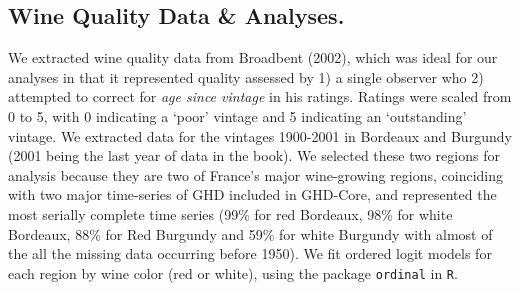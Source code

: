 \documentclass[final]{nature}
\begin{document}
\begin{methods}
\subsection{Wine Quality Data \& Analyses.}
We extracted wine quality data from Broadbent (2002)\cite{Broadbent2002}, which was ideal for our analyses in that it represented quality assessed by 1) a single observer who 2) attempted to correct for \emph{age since vintage} in his ratings. Ratings were scaled from 0 to 5, with 0 indicating a `poor' vintage and 5 indicating an `outstanding' vintage. We extracted data for the vintages 1900-2001 in Bordeaux and Burgundy (2001 being the last year of data in the book). We selected these two regions for analysis because they are two of France's major wine-growing regions, coinciding with two major time-series of GHD included in GHD-Core, and represented the most serially complete time series (99\% for red Bordeaux, 98\% for white Bordeaux, 88\% for Red Burgundy and 59\% for white Burgundy with almost of the all the missing data occurring before 1950). We fit ordered logit models for each region by wine color (red or white), using the package \verb|ordinal| in \verb|R|\cite{Rcore2014}.

\end{methods}






\end{document}
